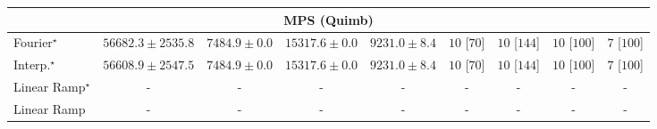 \begin{tabular}{l|cccc|cccc|}
\cline{1-9}
\multicolumn{9}{c}{\rule{0pt}{8pt}MPS (Quimb)} \\
\midrule
Fourier$^\star$ & {\cellcolor[HTML]{662506}} \color[HTML]{F1F1F1} $56682.3\pm 2535.8$ & {\cellcolor[HTML]{FFFEE1}} \color[HTML]{000000} $7484.9\pm 0.0$ & {\cellcolor[HTML]{FFF0AD}} \color[HTML]{000000} $15317.6\pm 0.0$ & {\cellcolor[HTML]{FFFCD6}} \color[HTML]{000000} $9231.0\pm 8.4$ & {\cellcolor[HTML]{49006A}} \color[HTML]{F1F1F1} $10$ [$70$] & {\cellcolor[HTML]{49006A}} \color[HTML]{F1F1F1} $10$ [$144$] & {\cellcolor[HTML]{49006A}} \color[HTML]{F1F1F1} $10$ [$100$] & {\cellcolor[HTML]{CD238F}} \color[HTML]{F1F1F1} $7$ [$100$] \\
Interp.$^\star$ & {\cellcolor[HTML]{662506}} \color[HTML]{F1F1F1} $56608.9\pm 2547.5$ & {\cellcolor[HTML]{FFFEE1}} \color[HTML]{000000} $7484.9\pm 0.0$ & {\cellcolor[HTML]{FFF0AD}} \color[HTML]{000000} $15317.6\pm 0.0$ & {\cellcolor[HTML]{FFFCD6}} \color[HTML]{000000} $9231.0\pm 8.4$ & {\cellcolor[HTML]{49006A}} \color[HTML]{F1F1F1} $10$ [$70$] & {\cellcolor[HTML]{49006A}} \color[HTML]{F1F1F1} $10$ [$144$] & {\cellcolor[HTML]{49006A}} \color[HTML]{F1F1F1} $10$ [$100$] & {\cellcolor[HTML]{CD238F}} \color[HTML]{F1F1F1} $7$ [$100$] \\
Linear Ramp$^\star$ & {\cellcolor[HTML]{000000}} \color[HTML]{F1F1F1} {\cellcolor{white}} \color{black} - & {\cellcolor[HTML]{000000}} \color[HTML]{F1F1F1} {\cellcolor{white}} \color{black} - & {\cellcolor[HTML]{000000}} \color[HTML]{F1F1F1} {\cellcolor{white}} \color{black} - & {\cellcolor[HTML]{000000}} \color[HTML]{F1F1F1} {\cellcolor{white}} \color{black} - & {\cellcolor[HTML]{000000}} \color[HTML]{F1F1F1} {\cellcolor{white}} \color{black} - & {\cellcolor[HTML]{000000}} \color[HTML]{F1F1F1} {\cellcolor{white}} \color{black} - & {\cellcolor[HTML]{000000}} \color[HTML]{F1F1F1} {\cellcolor{white}} \color{black} - & {\cellcolor[HTML]{000000}} \color[HTML]{F1F1F1} {\cellcolor{white}} \color{black} - \\
Linear Ramp & {\cellcolor[HTML]{000000}} \color[HTML]{F1F1F1} {\cellcolor{white}} \color{black} - & {\cellcolor[HTML]{000000}} \color[HTML]{F1F1F1} {\cellcolor{white}} \color{black} - & {\cellcolor[HTML]{000000}} \color[HTML]{F1F1F1} {\cellcolor{white}} \color{black} - & {\cellcolor[HTML]{000000}} \color[HTML]{F1F1F1} {\cellcolor{white}} \color{black} - & {\cellcolor[HTML]{000000}} \color[HTML]{F1F1F1} {\cellcolor{white}} \color{black} - & {\cellcolor[HTML]{000000}} \color[HTML]{F1F1F1} {\cellcolor{white}} \color{black} - & {\cellcolor[HTML]{000000}} \color[HTML]{F1F1F1} {\cellcolor{white}} \color{black} - & {\cellcolor[HTML]{000000}} \color[HTML]{F1F1F1} {\cellcolor{white}} \color{black} - \\

\end{tabular}
